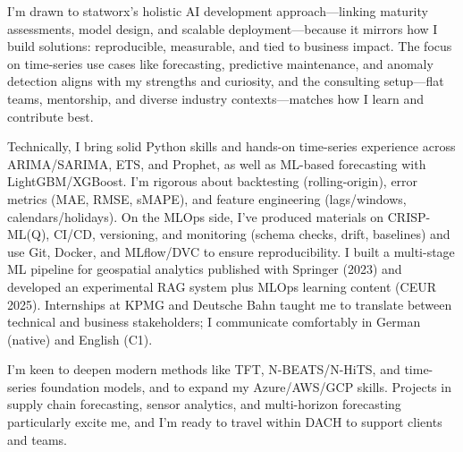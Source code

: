 I’m drawn to statworx’s holistic AI development approach—linking maturity assessments, model design, and scalable deployment—because it mirrors how I build solutions: reproducible, measurable, and tied to business impact. The focus on time-series use cases like forecasting, predictive maintenance, and anomaly detection aligns with my strengths and curiosity, and the consulting setup—flat teams, mentorship, and diverse industry contexts—matches how I learn and contribute best.

Technically, I bring solid Python skills and hands-on time-series experience across ARIMA/SARIMA, ETS, and Prophet, as well as ML-based forecasting with LightGBM/XGBoost. I’m rigorous about backtesting (rolling-origin), error metrics (MAE, RMSE, sMAPE), and feature engineering (lags/windows, calendars/holidays). On the MLOps side, I’ve produced materials on CRISP-ML(Q), CI/CD, versioning, and monitoring (schema checks, drift, baselines) and use Git, Docker, and MLflow/DVC to ensure reproducibility. I built a multi-stage ML pipeline for geospatial analytics published with Springer (2023) and developed an experimental RAG system plus MLOps learning content (CEUR 2025). Internships at KPMG and Deutsche Bahn taught me to translate between technical and business stakeholders; I communicate comfortably in German (native) and English (C1).

I’m keen to deepen modern methods like TFT, N-BEATS/N-HiTS, and time-series foundation models, and to expand my Azure/AWS/GCP skills. Projects in supply chain forecasting, sensor analytics, and multi-horizon forecasting particularly excite me, and I’m ready to travel within DACH to support clients and teams.